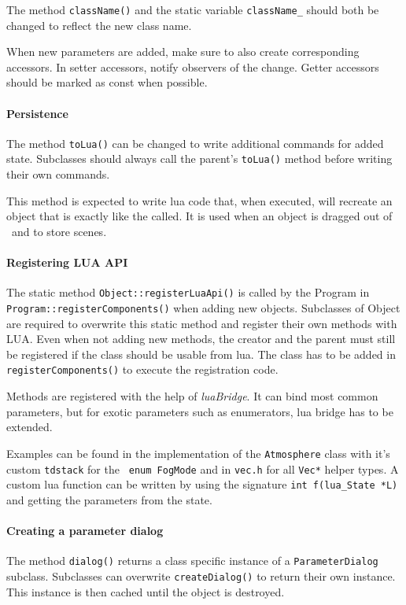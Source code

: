 The method \lstinline{className()} and the static variable \lstinline{className_} should both be changed to reflect the new class name.

When new parameters are added, make sure to also create corresponding accessors.
In setter accessors, notify observers of the change.
Getter accessors should be marked as const when possible.

\paragraph{Persistence}
The method \lstinline{toLua()} can be changed to write additional commands for added state.
Subclasses should always call the parent's \lstinline{toLua()} method before writing their own commands.

This method is expected to write lua code that, when executed, will recreate an object that is exactly like the called.
It is used when an object is dragged out of \ER\ and to store scenes.

\paragraph{Registering LUA API}
The static method \lstinline{Object::registerLuaApi()} is called by the Program in \lstinline{Program::registerComponents()} when adding new objects.
Subclasses of Object are required to overwrite this static method and register their own methods with LUA.
Even when not adding new methods, the creator and the parent must still be registered if the class should be usable from lua.
The class has to be added in \lstinline{registerComponents()} to execute the registration code.

Methods are registered with the help of \textit{luaBridge}.
It can bind most common parameters, but for exotic parameters such as enumerators, lua bridge has to be extended.

Examples can be found in the implementation of the \lstinline{Atmosphere} class with it's custom \lstinline{tdstack} for the \lstinline{ enum FogMode}
and in \texttt{vec.h} for all \lstinline{Vec*} helper types.
A custom lua function can be written by using the signature \lstinline{int f(lua_State *L)} and getting the parameters from the state.

\paragraph{Creating a parameter dialog}
The method \lstinline{dialog()} returns a class specific instance of a \lstinline{ParameterDialog} subclass.
Subclasses can overwrite \lstinline{createDialog()} to return their own instance.
This instance is then cached until the object is destroyed.

